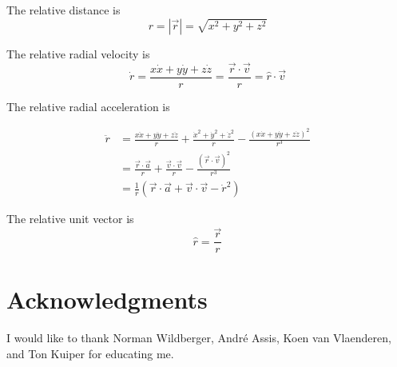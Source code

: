 \documentclass[12pt,a4paper]{article}
\theoremstyle{definition}
\theoremstyle{remark}
\begin{document}
The relative distance is
\[r = |\vec{r}| = \sqrt{x^2 + y^2 + z^2}\]

The relative radial velocity is
\[\dot{r} = \frac{x\dot{x} + y\dot{y} + z\dot{z}}{r} =  \frac{\vec{r} \cdot \vec{v}}{r} = \hat{r} \cdot \vec{v}\]

The relative radial acceleration is

\begin{align*}
    \ddot{r} & = \frac{x\ddot{x} + y\ddot{y} + z\ddot{z}}{r} + \frac{\dot{x}^2 + \dot{y}^2 + \dot{z}^2}{r} - \frac{(x\dot{x} + y\dot{y} + z\dot{z})^2}{r^3} \\
             & = \frac{\vec{r} \cdot \vec{a}}{r} + \frac{\vec{v} \cdot \vec{v}}{r} - \frac{(\vec{r} \cdot \vec{v})^2}{r^3}                                  \\
             & = \frac{1}{r}\left(\vec{r} \cdot \vec{a} + \vec{v} \cdot \vec{v} - \dot{r}^2\right)
\end{align*}

The relative unit vector is
\[\hat{r} = \frac{\vec{r}}{r}\]


\section*{Acknowledgments}
I would like to thank Norman Wildberger, André Assis, Koen van Vlaenderen, and Ton Kuiper for educating me.


\end{document}
